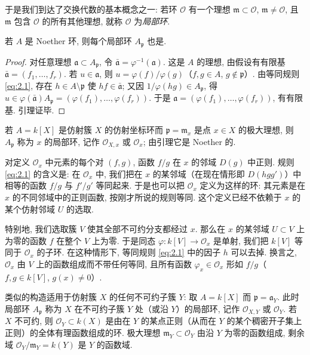 于是我们到达了交换代数的基本概念之一: 若环 $\mathcal O$ 有一个理想 $\mathfrak m \subset \mathcal O$, $\mathfrak m \ne \mathcal O$, 且 $\mathfrak m$ 包含 $\mathcal O$ 的所有其他理想, 就称 $\mathcal O$ 为\emph{局部环}.

\begin{lemma}\label{lem:ap-noetherian}
	若 $A$ 是 Noether 环, 则每个局部环 $A_{\mathfrak p}$ 也是.
\end{lemma}

\begin{proof}
	对任意理想 $\mathfrak a \subset A_{\mathfrak p}$, 令 $\bar{\mathfrak a} = \varphi^{-1}(\mathfrak a)$. 这是 $A$ 的理想, 由假设有有限基 $\bar{\mathfrak a} = (f_1, \ldots, f_r)$. 若 $u \in \mathfrak a$, 则 $u = \varphi(f)/\varphi(g)$（$f, g \in A$, $g \notin \mathfrak p$）. 由等同规则 \eqref{eq:2.1}, 存在 $h \in A \setminus \mathfrak p$ 使 $hf \in \bar{\mathfrak a}$; 又因 $1/\varphi(hg) \in A_{\mathfrak p}$, 得 $u \in \varphi(\bar{\mathfrak a}) A_{\mathfrak p} = (\varphi(f_1), \ldots, \varphi(f_r))$. 于是 $\mathfrak a = (\varphi(f_1), \ldots, \varphi(f_r))$, 有有限基. 引理证毕.
\end{proof}

若 $A = k[X]$ 是仿射簇 $X$ 的仿射坐标环而 $\mathfrak p = \mathfrak m_x$ 是点 $x \in X$ 的极大理想, 则 $A_{\mathfrak p}$ 称为 $x$ 的局部环, 记作 $\mathcal O_{X,x}$ 或 $\mathcal O_x$; 由引理它是 Noether 的.

对定义 $\mathcal O_x$ 中元素的每个对 $(f, g)$, 函数 $f/g$ 在 $x$ 的邻域 $D(g)$ 中正则. 规则 \eqref{eq:2.1} 的含义是: 在 $\mathcal O_x$ 中, 我们把在 $x$ 的某邻域（在现在情形即 $D(hgg')$）中相等的函数 $f/g$ 与 $f'/g'$ 等同起来. 于是也可以把 $\mathcal O_x$ 定义为这样的环: 其元素是在 $x$ 的不同邻域中的正则函数, 按刚才所说的规则等同. 这个定义已经不依赖于 $x$ 的某个仿射邻域 $U$ 的选取.

特别地, 我们选取簇 $V$ 使其全部不可约分支都经过 $x$. 那么在 $x$ 的某邻域 $U \subset V$ 上为零的函数 $f$ 在整个 $V$ 上为零. 于是同态 $\varphi: k[V] \to \mathcal O_x$ 是单射, 我们把 $k[V]$ 等同于 $\mathcal O_x$ 的子环. 在这种情形下, 等同规则 \eqref{eq:2.1} 中的因子 $h$ 可以去掉. 换言之, $\mathcal O_x$ 由 $V$ 上的函数组成而不带任何等同, 且所有函数 $\varphi_x \in \mathcal O_x$ 形如 $f/g$（$f, g \in k[V]$, $g(x) \ne 0$）.

类似的构造适用于仿射簇 $X$ 的任何不可约子簇 $Y$: 取 $A = k[X]$ 而 $\mathfrak p = \mathfrak a_Y$. 此时局部环 $A_{\mathfrak p}$ 称为 $X$ 在不可约子簇 $Y$ 处（或沿 $Y$）的局部环, 记作 $\mathcal O_{X,Y}$ 或 $\mathcal O_Y$. 若 $X$ 不可约, 则 $\mathcal O_Y \subset k(X)$ 是由在 $Y$ 的某点正则（从而在 $Y$ 的某个稠密开子集上正则）的全体有理函数组成的环. 极大理想 $\mathfrak m_Y \subset \mathcal O_Y$ 由沿 $Y$ 为零的函数组成, 剩余域 $\mathcal O_Y/\mathfrak m_Y = k(Y)$ 是 $Y$ 的函数域.

